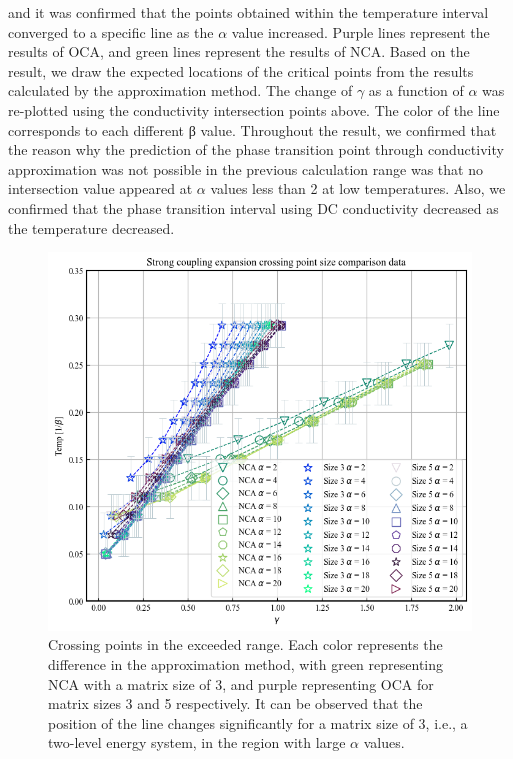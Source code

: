 \documentclass{article}[12pt]
\begin{document}
\begin{spacing}{1.5}
and it was confirmed that the points obtained within the temperature interval converged to a specific line as the $\alpha$ value increased. 
Purple lines represent the results of OCA, and green lines represent the results of NCA. 
Based on the result, we draw the expected locations of the critical points from the results calculated by the approximation method. 
The change of $\gamma$ as a function of $\alpha$ was re-plotted using the conductivity intersection points above. 
The color of the line corresponds to each different β value.
Throughout the result, we confirmed that the reason why the prediction of the phase transition point through conductivity approximation was not possible 
in the previous calculation range was that no intersection value appeared at $\alpha$ values less than 2 at low temperatures. 
Also, we confirmed that the phase transition interval using DC conductivity decreased as the temperature decreased.
\pagebreak
\begin{figure}[H]
  \centerline{\includegraphics[width=12cm]{TexFigure/output.png}}
  \caption{Crossing points in the exceeded range. Each color represents the difference in the approximation method, 
  with green representing NCA with a matrix size of 3,  and purple representing OCA for matrix sizes 3 and 5 respectively. 
  It can be observed that the position of the line changes significantly for a matrix size of 3, i.e., a two-level energy system, 
  in the region with large $\alpha$ values.}
\end{figure}
\begin{figure}[htbp]

\end{figure}
\end{spacing}
\end{document}
